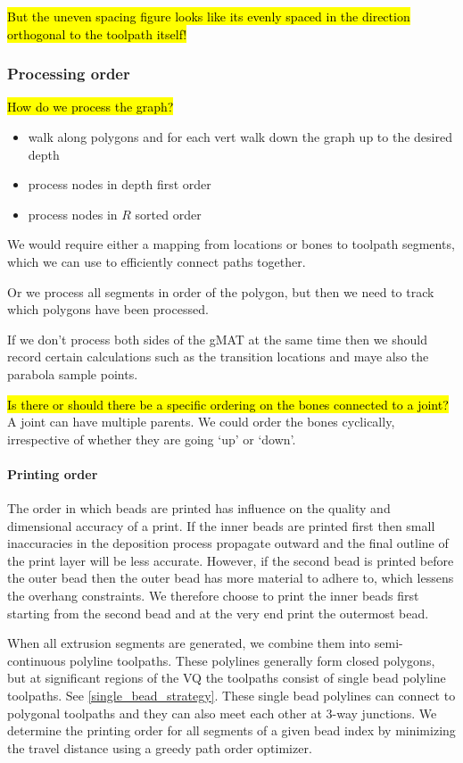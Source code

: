 \hl{But the uneven spacing figure looks like its evenly spaced in the direction orthogonal to the toolpath itself!}




\subsubsection{Processing order}
\hl{How do we process the graph?}
\begin{itemize}
\item walk along polygons and for each vert walk down the graph up to the desired depth
\item process nodes in depth first order
\item process nodes in $R$ sorted order
\end{itemize}

We would require either a mapping from locations or bones to toolpath segments, which we can use to efficiently connect paths together.

Or we process all segments in order of the polygon, but then we need to track which polygons have been processed.

If we don't process both sides of the gMAT at the same time then we should record certain calculations such as the transition locations and maye also the parabola sample points.

\hl{Is there or should there be a specific ordering on the bones connected to a joint?}
A joint can have multiple parents.
We could order the bones cyclically, irrespective of whether they are going `up' or `down'.




\paragraph{Printing order}
The order in which beads are printed has influence on the quality and dimensional accuracy of a print.
If the inner beads are printed first then small inaccuracies in the deposition process propagate outward and the final outline of the print layer will be less accurate.
However, if the second bead is printed before the outer bead then the outer bead has more material to adhere to, which lessens the overhang constraints.
We therefore choose to print the inner beads first starting from the second bead and at the very end print the outermost bead.


When all extrusion segments are generated, we combine them into semi-continuous polyline toolpaths.
These polylines generally form closed polygons, but at significant regions of the VQ the toolpaths consist of single bead polyline toolpaths.
See \cref{single_bead_strategy}.
These single bead polylines can connect to polygonal toolpaths and they can also meet each other at 3-way junctions.
We determine the printing order for all segments of a given bead index by minimizing the travel distance using a greedy path order optimizer.


